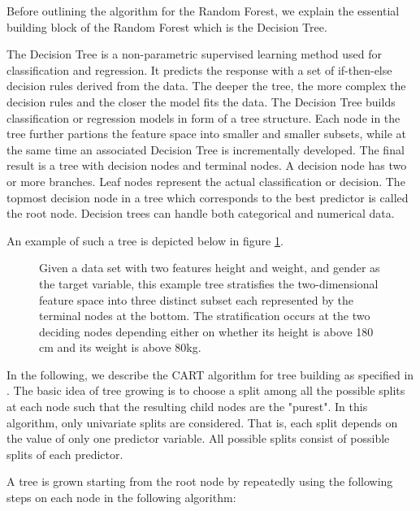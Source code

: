 Before outlining the algorithm for the Random Forest, we explain the essential 
building block of the Random Forest which is the Decision Tree.

The Decision Tree is a non-parametric supervised learning method used for classification and regression.
It predicts the response with a set of if-then-else decision rules derived from the data.
The deeper the tree, the more complex the decision rules and the closer the model fits the data.
The Decision Tree builds classification or regression models in form of a tree structure.
Each node in the tree further partions the feature space into smaller and smaller subsets, 
while at the same time an associated Decision Tree is incrementally developed.
The final result is a tree with decision nodes and terminal nodes. 
A decision node has two or more branches.
Leaf nodes represent the actual classification or decision. 
The topmost decision node in a tree which corresponds to the best predictor is called the root node.
Decision trees can handle both categorical and numerical data.

An example of such a tree is depicted below in figure \ref{fig:decision_tree_example}.

\begin{figure}[H]
    \captionsetup{format=plain}
    \caption{Given a data set with two features height and weight, and gender as the target variable, 
             this example tree stratisfies the two-dimensional feature space into three distinct subset each 
             represented by the terminal nodes at the bottom.
             The stratification occurs at the two deciding nodes depending either on whether its height is above 180 cm 
             and its weight is above 80kg.
             }
    \label{fig:decision_tree_example}
\end{figure}

In the following, we describe the CART algorithm for tree building as specified in \cite{breiman1984decisionTree}.
The basic idea of tree growing is to choose a split among all the possible splits at each node
such that the resulting child nodes are the "purest". In this algorithm, only univariate splits are
considered. That is, each split depends on the value of only one predictor variable. All
possible splits consist of possible splits of each predictor.

A tree is grown starting from the root node by repeatedly using the following steps on each
node in the following algorithm:

